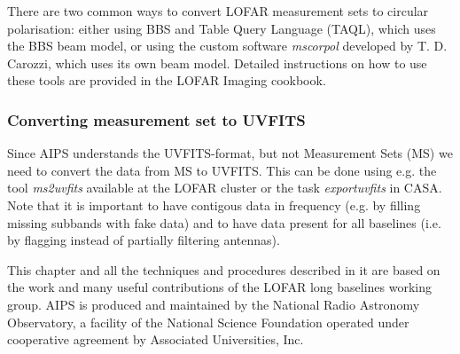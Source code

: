 \documentclass[graybox]{svmult}
\begin{document}
There are two common ways to convert LOFAR measurement sets to circular polarisation:
either using BBS and Table Query Language (TAQL), which uses the BBS beam model,
or using the custom software \emph{mscorpol} developed by T. D. Carozzi, which uses
its own beam model. Detailed instructions on how to use these tools are provided in the LOFAR Imaging cookbook.

\subsubsection{Converting measurement set to UVFITS}
Since AIPS understands the UVFITS-format, but not Measurement Sets (MS)
we need to convert the data from MS to UVFITS. This can be done using e.g.
the tool \emph{ms2uvfits} available at the LOFAR cluster or the task \emph{exportuvfits} in CASA.
Note that it is important to have contigous data in frequency (e.g. by filling 
missing subbands with fake data) and to have data present for all baselines (i.e.
by flagging instead of partially filtering antennas). 



\begin{acknowledgement}
This chapter and all the techniques and procedures described in it are based on
the work and many useful contributions of the LOFAR long baselines working
group. AIPS is produced and maintained by the National Radio Astronomy
Observatory, a facility of the National Science Foundation operated under
cooperative agreement by Associated Universities, Inc.

\end{acknowledgement}

%



\end{document}
